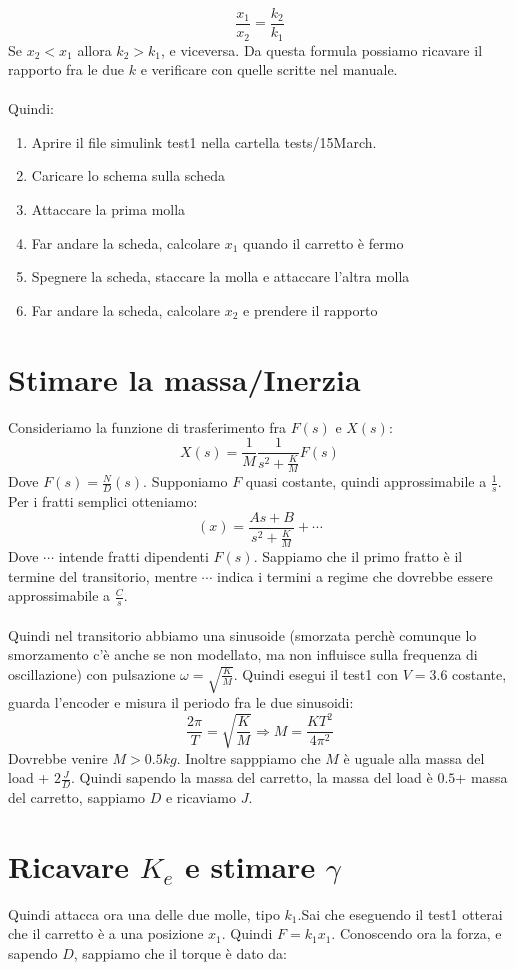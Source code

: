 \documentclass[10pt,a4paper]{article}
\begin{document}
$$\frac{x_1}{x_2} = \frac{k_2}{k_1}$$
Se $x_2 < x_1$ allora $k_2 > k_1$, e viceversa.  Da questa formula possiamo ricavare il rapporto fra le due $k$ e verificare con quelle scritte nel manuale. \\ \\
Quindi:
\begin{enumerate}
\item Aprire il file simulink test1 nella cartella tests/15March.
\item Caricare lo schema sulla scheda
\item Attaccare la prima molla
\item Far andare la scheda, calcolare $x_1$ quando il carretto è fermo
\item Spegnere la scheda, staccare la molla e attaccare l'altra molla
\item Far andare la scheda, calcolare $x_2$ e prendere il rapporto
\end{enumerate}
\newpage
\section{Stimare la massa/Inerzia}
Consideriamo la funzione di trasferimento fra $F(s)$ e $X(s)$:
$$X(s)= \frac{1}{M}\frac{1}{s^2+\frac{K}{M}}F(s)$$
Dove $F(s) = \frac{N}{D}(s)$. Supponiamo $F$ quasi costante, quindi approssimabile a $\frac{1}{s}$. Per i fratti semplici otteniamo:
$$(x) = \frac{As+B}{s^2+\frac{K}{M}}+\cdots$$
Dove $\cdots$ intende fratti dipendenti $F(s)$. Sappiamo che il primo fratto è il termine del transitorio, mentre $\cdots$  indica i termini a regime che dovrebbe essere approssimabile a $\frac{C}{s}$. \\ \\
Quindi nel transitorio abbiamo una sinusoide (smorzata perchè comunque lo smorzamento c'è anche se non modellato, ma non influisce sulla frequenza di oscillazione) con pulsazione $\omega = \sqrt{\frac{K}{M}}$. Quindi esegui il test1 con $V=3.6$ costante, guarda l'encoder e misura il periodo fra le due sinusoidi:
$$\frac{2\pi}{T}= \sqrt{\frac{K}{M}} \Rightarrow M = \frac{KT^2}{4\pi^2}$$
Dovrebbe venire $M > 0.5kg$.
Inoltre sapppiamo che $M$ è uguale alla massa del load + $2\frac{J}{D}$. Quindi sapendo la massa del carretto, la massa del load è $0.5$+ massa del carretto, sappiamo $D$ e ricaviamo $J$.
\newpage
\section{Ricavare $K_e$ e stimare $\gamma$}
Quindi attacca ora una delle due molle, tipo $k_1$.Sai che eseguendo il test1 otterai che il carretto è a una posizione $x_1$. Quindi $F=k_1 x_1$.
Conoscendo ora la forza, e sapendo $D$, sappiamo che il torque è dato da:
\end{document}
